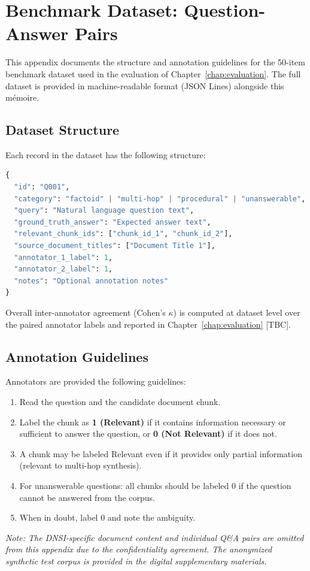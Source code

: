 \chapter{Benchmark Dataset: Question-Answer Pairs}
\label{app:benchmark}

This appendix documents the structure and annotation guidelines for the 50-item benchmark dataset used in the evaluation of Chapter~\ref{chap:evaluation}. The full dataset is provided in machine-readable format (JSON Lines) alongside this mémoire.

\section*{Dataset Structure}

Each record in the dataset has the following structure:

\begin{lstlisting}[language=Python, caption={Benchmark dataset record schema}]
{
  "id": "Q001",
  "category": "factoid" | "multi-hop" | "procedural" | "unanswerable",
  "query": "Natural language question text",
  "ground_truth_answer": "Expected answer text",
  "relevant_chunk_ids": ["chunk_id_1", "chunk_id_2"],
  "source_document_titles": ["Document Title 1"],
  "annotator_1_label": 1,
  "annotator_2_label": 1,
  "notes": "Optional annotation notes"
}
\end{lstlisting}

Overall inter-annotator agreement (Cohen's $\kappa$) is computed at dataset level over the paired annotator labels and reported in Chapter~\ref{chap:evaluation} [TBC].

\section*{Annotation Guidelines}

Annotators are provided the following guidelines:

\begin{enumerate}
  \item Read the question and the candidate document chunk.
  \item Label the chunk as \textbf{1 (Relevant)} if it contains information necessary or sufficient to answer the question, or \textbf{0 (Not Relevant)} if it does not.
  \item A chunk may be labeled Relevant even if it provides only partial information (relevant to multi-hop synthesis).
  \item For unanswerable questions: all chunks should be labeled 0 if the question cannot be answered from the corpus.
  \item When in doubt, label 0 and note the ambiguity.
\end{enumerate}

\textit{Note: The DNSI-specific document content and individual Q\&A pairs are omitted from this appendix due to the confidentiality agreement. The anonymized synthetic test corpus is provided in the digital supplementary materials.}
